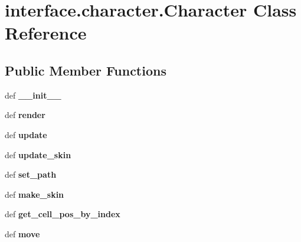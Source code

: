 \hypertarget{classinterface_1_1character_1_1_character}{\section{interface.\-character.\-Character \-Class \-Reference}
\label{classinterface_1_1character_1_1_character}
}
\subsection*{\-Public \-Member \-Functions}
\begin{DoxyCompactItemize}
\item 
\hypertarget{classinterface_1_1character_1_1_character_ae3f397183b0cb17ed496568a19489df7}{def {\bfseries \-\_\-\-\_\-init\-\_\-\-\_\-}}\label{classinterface_1_1character_1_1_character_ae3f397183b0cb17ed496568a19489df7}

\item 
\hypertarget{classinterface_1_1character_1_1_character_a7082a3f7edbee4d7e6a0a5bafa777648}{def {\bfseries render}}\label{classinterface_1_1character_1_1_character_a7082a3f7edbee4d7e6a0a5bafa777648}

\item 
\hypertarget{classinterface_1_1character_1_1_character_a03b20ff30055b5d8f31a5ebfa90b8219}{def {\bfseries update}}\label{classinterface_1_1character_1_1_character_a03b20ff30055b5d8f31a5ebfa90b8219}

\item 
\hypertarget{classinterface_1_1character_1_1_character_a04d019c6a16205c30bf2819eedd7f065}{def {\bfseries update\-\_\-skin}}\label{classinterface_1_1character_1_1_character_a04d019c6a16205c30bf2819eedd7f065}

\item 
\hypertarget{classinterface_1_1character_1_1_character_a211faaf328c7cde48c84b3c55f52f5a8}{def {\bfseries set\-\_\-path}}\label{classinterface_1_1character_1_1_character_a211faaf328c7cde48c84b3c55f52f5a8}

\item 
\hypertarget{classinterface_1_1character_1_1_character_aa52e569dcec4cfdbdbcb008d06bb70eb}{def {\bfseries make\-\_\-skin}}\label{classinterface_1_1character_1_1_character_aa52e569dcec4cfdbdbcb008d06bb70eb}

\item 
\hypertarget{classinterface_1_1character_1_1_character_aba798813cf35091b2d9d4ba7b2cc121c}{def {\bfseries get\-\_\-cell\-\_\-pos\-\_\-by\-\_\-index}}\label{classinterface_1_1character_1_1_character_aba798813cf35091b2d9d4ba7b2cc121c}

\item 
\hypertarget{classinterface_1_1character_1_1_character_abee2addbf39cfd0c26b4a8efff511226}{def {\bfseries move}}\label{classinterface_1_1character_1_1_character_abee2addbf39cfd0c26b4a8efff511226}

\end{DoxyCompactItemize}
